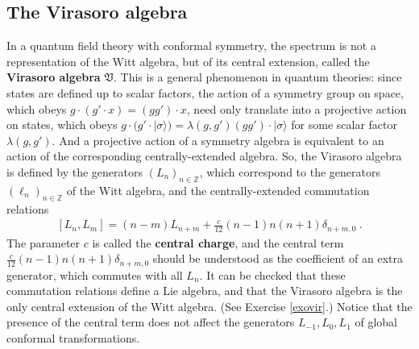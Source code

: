 \documentclass[12pt,a4paper,notitlepage]{report}
\numberwithin{equation}{section}
\theoremstyle{break}
\begin{document}
\subsection{The Virasoro algebra \label{secvir}}

In a quantum field theory with conformal symmetry, the spectrum is not a representation of the Witt algebra, but of 
its central extension, called the \textbf{\boldmath Virasoro algebra} $\mathfrak{V}$.
This is a general phenomenon in quantum theories: since states are defined up to scalar factors, the action of a symmetry group on space, which obeys $g\cdot(g'\cdot x) = (gg')\cdot x$, need only translate into a projective action on states, which obeys $g\cdot(g'\cdot|\sigma\rangle) = \lambda(g,g') (gg')\cdot |\sigma\rangle$ for some scalar factor $\lambda(g,g')$. 
And a projective action of a symmetry algebra is equivalent to an action of the corresponding centrally-extended algebra. 
So, the Virasoro algebra is defined by the generators $(L_n)_{n\in {\mathbb{Z}}}$, which correspond to the generators $(\ell_n)_{n\in \mathbb{Z}}$ of the Witt algebra, and the centrally-extended commutation relations
\begin{align}
 \boxed{[L_n,L_m]=(n-m)L_{n+m} + \frac{c}{12} (n-1)n(n+1) \delta_{n+m,0}}\ .
\label{vir}
\end{align}
The parameter $c$ is called the \textbf{\boldmath central charge}, and the central term $\frac{c}{12} (n-1)n(n+1) \delta_{n+m,0}$ should be understood as the coefficient of an extra generator, which commutes with all $L_n$.
It can be checked that these commutation relations define a Lie algebra, and that the Virasoro algebra is the only central extension of the Witt algebra. (See Exercise \ref{exovir}.) Notice that the presence of the central term does not affect the generators $L_{-1},L_0,L_1$ of global conformal transformations. 
\end{document}
